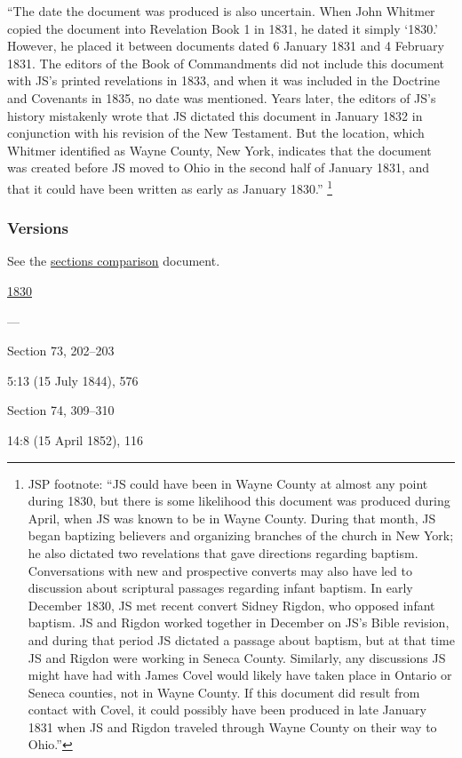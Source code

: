 			``The date the document was produced is also uncertain. When John Whitmer copied the document into Revelation Book 1 in 1831, he dated it simply `1830.' However, he placed it between documents dated 6 January 1831 and 4 February 1831. The editors of the Book of Commandments did not include this document with JS's printed revelations in 1833, and when it was included in the Doctrine and Covenants in 1835, no date was mentioned. Years later, the editors of JS's history mistakenly wrote that JS dictated this document in January 1832 in conjunction with his revision of the New Testament. But the location, which Whitmer identified as Wayne County, New York, indicates that the document was created before JS moved to Ohio in the second half of January 1831, and that it could have been written as early as January 1830.''%
				\footnote{%
					JSP footnote: ``JS could have been in Wayne County at almost any point during 1830, but there is some likelihood this document was produced during April, when JS was known to be in Wayne County. During that month, JS began baptizing believers and organizing branches of the church in New York; he also dictated two revelations that gave directions regarding baptism. Conversations with new and prospective converts may also have led to discussion about scriptural passages regarding infant baptism. In early December 1830, JS met recent convert Sidney Rigdon, who opposed infant baptism. JS and Rigdon worked together in December on JS's Bible revision, and during that period JS dictated a passage about baptism, but at that time JS and Rigdon were working in Seneca County. Similarly, any discussions JS might have had with James Covel would likely have taken place in Ontario or Seneca counties, not in Wayne County. If this document did result from contact with Covel, it could possibly have been produced in late January 1831 when JS and Rigdon traveled through Wayne County on their way to Ohio.''
					}
		
	\subsubsection{Versions}
		\label{DC74-V}
		
		See the \href{https://drive.google.com/file/d/1goAvNz8jS4R8slYfMG_db55Ty2z_vmgK/view?usp=sharing}{sections comparison} document.
	
		\begin{compactdesc}
			\item[JSP] \hyperref[EMS-1830-JS-1830]{1830}
			\item[BC] ---
			\item[DC 1835] Section 73, 202--203
			\item[TS] 5:13 (15 July 1844), 576
			\item[DC 1844] Section 74, 309--310
			\item[MS] 14:8 (15 April 1852), 116
		\end{compactdesc}

